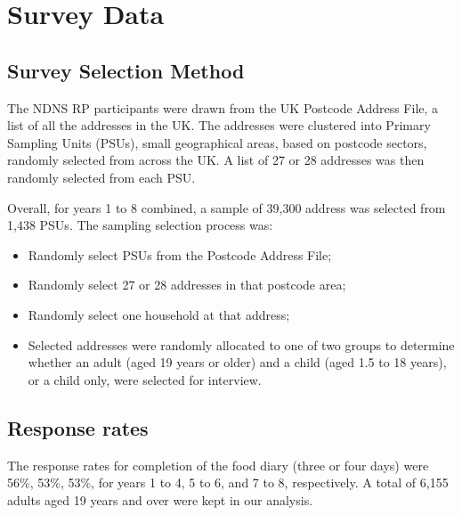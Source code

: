 
\section{Survey Data}\vspace{-0.3cm}

\subsection{Survey Selection Method}\vspace{-0.3cm}

The NDNS RP participants were drawn from the UK Postcode Address File, a list of all the addresses in the UK. The addresses were clustered into Primary Sampling Units (PSUs), small geographical areas, based on postcode sectors, randomly selected from across the UK. A list of 27 or 28 addresses was then randomly selected from each PSU.

Overall, for years 1 to 8 combined, a sample of 39,300 address was selected from 1,438 PSUs. The sampling selection process was: 

\begin{itemize}
	\item Randomly select PSUs from the Postcode Address File; 
	\item Randomly select 27 or 28 addresses in that postcode area; 
	\item Randomly select one household at that address; 
	\item Selected addresses were randomly allocated to one of two groups to determine whether an adult (aged 19 years or older) and a child (aged 1.5 to 18 years), or a child only, were selected for interview.
\end{itemize}
\vspace{-0.6cm}
\subsection{Response rates}\vspace{-0.3cm}

The response rates for completion of the food diary (three or four days) were 56\%, 53\%, 53\%, for years 1 to 4, 5 to 6, and 7 to 8, respectively. A total of 6,155 adults aged 19 years and over were kept in our analysis. 
\vspace{-0.6cm}

